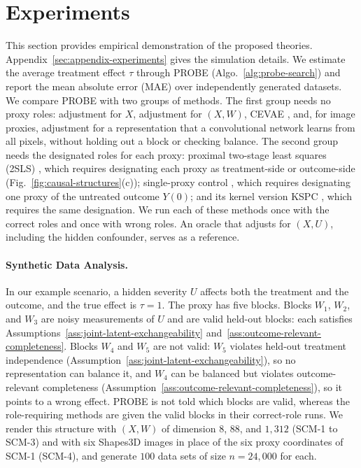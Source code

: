 \section{Experiments}
\label{sec:main-experiments}

This section provides empirical demonstration of the proposed theories. Appendix~\ref{sec:appendix-experiments} gives the simulation details. We estimate the average treatment effect $\tau$ through PROBE (Algo.~\ref{alg:probe-search}) and report the mean absolute error (MAE) over independently generated datasets. We compare PROBE with two groups of methods. The first group needs no proxy roles: adjustment for $X$, adjustment for $(X,W)$, CEVAE \citep{louizos2017causal}, and, for image proxies, adjustment for a representation that a convolutional network learns from all pixels, without holding out a block or checking balance. The second group needs the designated roles for each proxy: proximal two-stage least squares (2SLS) \citep{tchetgen2024ProximalCausalInference}, which requires designating each proxy as treatment-side or outcome-side (Fig.~\ref{fig:causal-structures}(c)); single-proxy control \citep{park2024single}, which requires designating one proxy of the untreated outcome $Y(0)$; and its kernel version KSPC \citep{xu2025kernel}, which requires the same designation. We run each of these methods once with the correct roles and once with wrong roles. An oracle that adjusts for $(X,U)$, including the hidden confounder, serves as a reference.

\paragraph{Synthetic Data Analysis.} In our example scenario, a hidden severity $U$ affects both the treatment and the outcome, and the true effect is $\tau=1$. The proxy has five blocks. Blocks $W_1$, $W_2$, and $W_3$ are noisy measurements of $U$ and are valid held-out blocks: each satisfies Assumptions~\ref{ass:joint-latent-exchangeability} and~\ref{ass:outcome-relevant-completeness}. Blocks $W_4$ and $W_5$ are not valid: $W_5$ violates held-out treatment independence (Assumption~\ref{ass:joint-latent-exchangeability}), so no representation can balance it, and $W_4$ can be balanced but violates outcome-relevant completeness (Assumption~\ref{ass:outcome-relevant-completeness}), so it points to a wrong effect. PROBE is not told which blocks are valid, whereas the role-requiring methods are given the valid blocks in their correct-role runs. We render this structure with $(X,W)$ of dimension $8$, $88$, and $1{,}312$ (SCM-1 to SCM-3) and with six Shapes3D images in place of the six proxy coordinates of SCM-1 (SCM-4), and generate $100$ data sets of size $n=24{,}000$ for each. 

